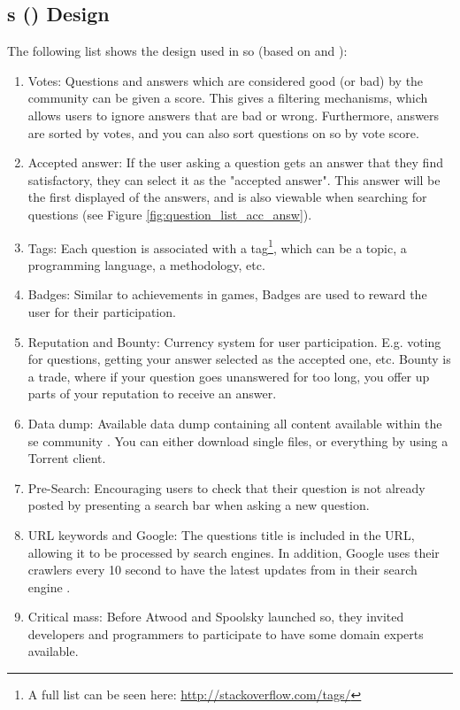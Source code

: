 \subsection[Stack Overflows design]{s () Design}
\label{sec:stackoverflow_design}
The following list shows the design used in \gls{so} (based on \textcite[p.~6-7]{M.Sewak2010} and \textcite[p.~805]{Treude2011}):
\begin{enumerate}
	\item Votes: Questions and answers which are considered good (or bad) by the community can be given a score. 
	This gives a filtering mechanisms, which allows users to ignore answers that are bad or wrong. 
	Furthermore, answers are sorted by votes, and you can also sort questions on \gls{so} by vote score. 
	\item Accepted answer: If the user asking a question gets an answer that they find satisfactory, they can select it as the "accepted answer". 
	This answer will be the first displayed of the answers, and is also viewable when searching for questions (see Figure \ref{fig:question_list_acc_answ}).
	\item Tags: Each question is associated with a tag\footnote{
		A full list can be seen here: \url{http://stackoverflow.com/tags/}
	}, which can be a topic, a programming language, a methodology, etc.
	\item Badges: Similar to achievements in games, Badges are used to reward the user for their participation.
	\item Reputation and Bounty: Currency system for user participation. 
	E.g. voting for questions, getting your answer selected as the accepted one, etc.
	Bounty is a trade, where if your question goes unanswered for too long, you offer up parts of your reputation to receive an answer.
	\item Data dump: Available data dump containing all content available within the \gls{se} community \cite{StackExchange2016}. 
	You can either download single files, or everything by using a Torrent client.
	\item Pre-Search: Encouraging users to check that their question is not already posted by presenting a search bar when asking a new question. 
	\item URL keywords and Google: The questions title is included in the URL, allowing it to be processed by search engines. 
	In addition, Google uses their crawlers every 10 second to have the latest updates from  in their search engine \cite{Gobry2011}.
	\item Critical mass: Before Atwood and Spoolsky launched \gls{so}, they invited developers and programmers to participate to have some domain experts available. 
\end{enumerate}

